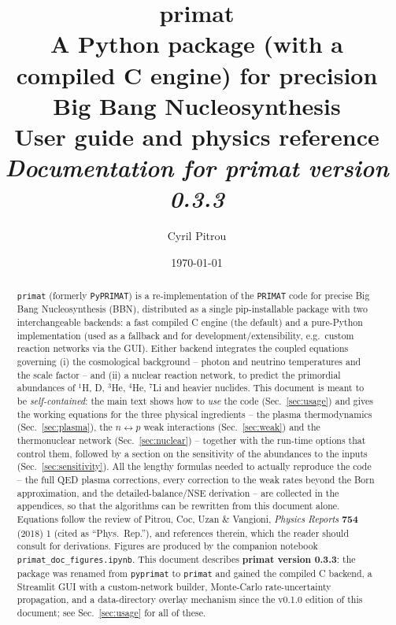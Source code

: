 \documentclass[11pt,a4paper]{article}
\title{\textbf{primat}\\[2pt]
       \large A Python package (with a compiled C engine) for precision Big
       Bang Nucleosynthesis\\[6pt]
       \normalsize User guide and physics reference\\[4pt]
       \normalsize\textit{Documentation for primat version 0.3.3}}
\author{Cyril Pitrou}
\date{\today}
\newcommand{\code}[1]{\texttt{#1}}
\newcommand{\PR}{Phys.\ Rep.}
\begin{document}
\maketitle

\begin{abstract}
\noindent
\code{primat} (formerly \code{PyPRIMAT}) is a re-implementation of the
\code{PRIMAT} code for precise Big Bang Nucleosynthesis (BBN), distributed as
a single pip-installable package with two interchangeable backends: a fast
compiled C engine (the default) and a pure-Python implementation (used as a
fallback and for development/extensibility, e.g.\ custom reaction networks
via the GUI). Either backend integrates the coupled equations governing
(i) the cosmological background -- photon and neutrino temperatures and the
scale factor -- and (ii) a nuclear reaction network, to predict the primordial
abundances of $^{1}$H, D, $^{3}$He, $^{4}$He, $^{7}$Li and heavier nuclides.
This document is meant to be \emph{self-contained}: the main text shows how to
\emph{use} the code (Sec.~\ref{sec:usage}) and gives the working equations for
the three physical ingredients -- the plasma thermodynamics
(Sec.~\ref{sec:plasma}), the $n\leftrightarrow p$ weak interactions
(Sec.~\ref{sec:weak}) and the thermonuclear network (Sec.~\ref{sec:nuclear}) --
together with the run-time options that control them, followed by a section on
the sensitivity of the abundances to the inputs (Sec.~\ref{sec:sensitivity}).
All the lengthy formulas needed to actually reproduce the code -- the full QED
plasma corrections, every correction to the weak rates beyond the Born
approximation, and the detailed-balance/NSE derivation -- are collected in the
appendices, so that the algorithms can be rewritten from this document alone.
Equations follow the review of Pitrou, Coc, Uzan \& Vangioni,
\emph{Physics Reports} \textbf{754} (2018) 1 \cite{PhysRep2018} (cited as
``\PR''), and references therein, which the reader should consult for
derivations.  Figures are produced by the companion notebook
\code{primat\_doc\_figures.ipynb}. This document describes \textbf{primat
version 0.3.3}: the package was renamed from \code{pyprimat} to \code{primat}
and gained the compiled C backend, a Streamlit GUI with a custom-network
builder, Monte-Carlo rate-uncertainty propagation, and a data-directory
overlay mechanism since the v0.1.0 edition of this document; see
Sec.~\ref{sec:usage} for all of these.
\end{abstract}

\tableofcontents
\end{document}
